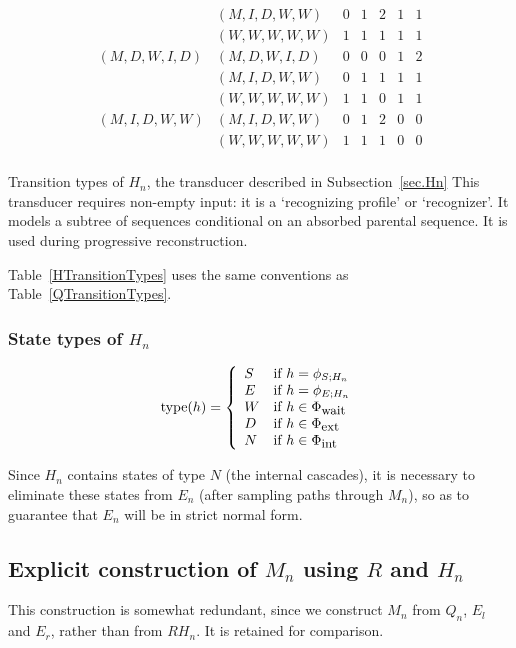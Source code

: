 \documentclass{article}
\newcommand{\secref}[1]{Subsection~\ref{sec.#1}}
\newcommand\compose{}
\newcommand\States{\Phi}
\newcommand\statesof[1]{\States_{#1}}
\newcommand\startstateof[1]{\phi_{S;#1}}
\newcommand\laststateof[1]{\phi_{E;#1}}
\newcommand\statetype{\mbox{type}}
\newcommand\stateset[1]{\statesof{\mbox{\small #1}}}
\newcommand\externalsuffix{ext}
\newcommand\internalsuffix{int}
\newcommand\waitsuffix{wait}
\newcommand\externalcascades{\stateset{\externalsuffix}}
\newcommand\internalcascades{\stateset{\internalsuffix}}
\newcommand\waitstates{\stateset{\waitsuffix}}
\begin{document}
\begin{table}
\[\begin{array}{ll|ccccc}
            & (M,I,D,W,W) & 0 & 1 & 2 & 1 & 1 \\
            & (W,W,W,W,W) & 1 & 1 & 1 & 1 & 1 \\
\hline
(M,D,W,I,D) & (M,D,W,I,D) & 0 & 0 & 0 & 1 & 2 \\
            & (M,I,D,W,W) & 0 & 1 & 1 & 1 & 1 \\
            & (W,W,W,W,W) & 1 & 1 & 0 & 1 & 1 \\
\hline
(M,I,D,W,W) & (M,I,D,W,W) & 0 & 1 & 2 & 0 & 0 \\
            & (W,W,W,W,W) & 1 & 1 & 1 & 0 & 0 \\
\end{array}
\]
\caption{
\label{HTransitionTypes}
Transition types of $H_n$, the transducer described in  \secref{Hn}
 This transducer requires non-empty input: it is
 a `recognizing profile' or `recognizer'. It  models a subtree of sequences
 conditional on an absorbed parental sequence. 
It is used during progressive reconstruction.}
\end{table}
Table~\ref{HTransitionTypes} uses the same conventions as Table~\ref{QTransitionTypes}.

\subsubsection{State types of $H_n$}

\[
\statetype(h) = \left\{ \begin{array}{ll}
S & \mbox{if $h = \startstateof{H_n}$} \\
E & \mbox{if $h = \laststateof{H_n}$} \\
W & \mbox{if $h \in \waitstates$} \\
D & \mbox{if $h \in \externalcascades$} \\
N & \mbox{if $h \in \internalcascades$}
\end{array} \right.
\]

Since $H_n$ contains states of type $N$ (the internal cascades),
it is necessary to eliminate these states from $E_n$ (after sampling paths through $M_n$),
so as to guarantee that $E_n$ will be in strict normal form.



\subsection{Explicit construction of $M_n$ using $R$ and $H_n$}

This construction is somewhat redundant, since we construct $M_n$ from $Q_n$, $E_l$ and $E_r$, rather than from $R \compose H_n$.
It is retained for comparison.
\end{document}
